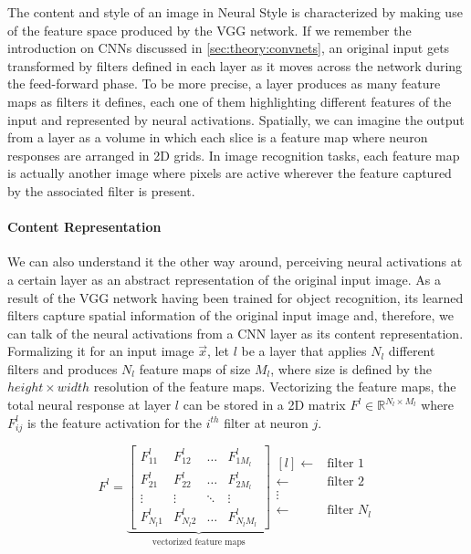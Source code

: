 The content and style of an image in Neural Style is characterized by making use of the feature space produced by the VGG network.
If we remember the introduction on CNNs discussed in \autoref{sec:theory:convnets}, an original input gets transformed by filters defined in each layer as it moves across the network during the feed-forward phase.
To be more precise, a layer produces as many feature maps as filters it defines, each one of them highlighting different features of the input and represented by neural activations.
Spatially, we can imagine the output from a layer as a volume in which each slice is a feature map where neuron responses are arranged in 2D grids.
In image recognition tasks, each feature map is actually another image where pixels are active wherever the feature captured by the associated filter is present.

\paragraph{Content Representation}
We can also understand it the other way around, perceiving neural activations at a certain layer as an abstract representation of the original input image.
As a result of the VGG network having been trained for object recognition, its learned filters capture spatial information of the original input image and, therefore, we can talk of the neural activations from a CNN layer as its content representation.
Formalizing it for an input image $\vec{x}$, let $l$ be a layer that applies $N_l$ different filters and produces $N_l$ feature maps of size $M_l$, where size is defined by the ${height}\times{width}$ resolution of the feature maps.
Vectorizing the feature maps, the total neural response at layer $l$ can be stored in a 2D matrix $F^l \in \mathbb{R}^{{N_l}\times{M_l}}$ where $F^l_{ij}$ is the feature activation for the $i^{th}$ filter at neuron $j$.

\begin{equation}
  F^l =
  \underbrace{
    \begin{bmatrix}
      F^l_{11}   & F^l_{12}   & \dots  & F^l_{1M_l} \\
      F^l_{21}   & F^l_{22}   & \dots  & F^l_{2M_l} \\
      \vdots     & \vdots     & \ddots & \vdots   \\
      F^l_{N_l1} & F^l_{N_l2} & \dots  & F^l_{N_lM_l}
    \end{bmatrix}
  }_{\text{vectorized feature maps}}
  \begin{matrix*}[l]
    \leftarrow & \text{filter } 1 \\
    \leftarrow & \text{filter } 2 \\
    \vdots                     \\
    \leftarrow & \text{filter } N_l
  \end{matrix*}
\end{equation}

